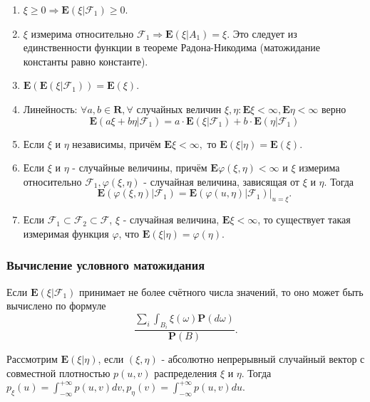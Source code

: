 \documentclass[oneside,final,14pt]{extreport}
\theoremstyle{definition}
\begin{document}
\begin{enumerate}
    \item $\xi \geq 0 \Rightarrow \mathbf{E}\left(\xi | \mathcal{F}_{1}\right) \geq 0.$
    \item $\xi$ измерима относительно $\mathcal{F}_1 \Rightarrow \mathbf{E}\left(\xi | A_{1}\right)=\xi$. Это следует из единственности функции в теореме Радона-Никодима (матожидание константы равно константе).
    \item $\mathbf{E}\left(\mathbf{E}\left(\xi | \mathcal{F}_{1}\right)\right)=\mathbf{E}(\xi)$.
    \item Линейность: $\forall a, b \in \mathbf{R}, \forall$ случайных величин $\xi, \eta: \mathbf{E} \xi<\infty, \mathbf{E} \eta<\infty$ верно
    $$\mathbf{E}\left(a \xi+b \eta | \mathcal{F}_{1}\right)=a \cdot \mathbf{E}\left(\xi | \mathcal{F}_{1}\right)+b \cdot \mathbf{E}\left(\eta | \mathcal{F}_{1}\right)$$
    \item Если $\xi$ и $\eta$ независимы, причём $\mathbf{E} \xi<\infty,$ то $\mathbf{E}(\xi | \eta)=\mathbf{E}(\xi)$.
    \item Если $\xi$ и $\eta$ - случайные величины, причём $\mathbf{E} \varphi(\xi, \eta)<\infty$ и $\xi$ измерима относительно $\mathcal{F}_1, \varphi(\xi,\eta)$ - случайная величина, зависящая от $\xi$ и $\eta$. Тогда
    $$\mathbf{E}\left(\varphi(\xi, \eta) | \mathcal{F}_{1}\right)=\left. \mathbf{E}\left(\varphi(u, \eta) | \mathcal{F}_{1}\right)\right|_{u=\xi}.$$
    \item Если $\mathcal{F}_1 \subset \mathcal{F}_2 \subset \mathcal{F}$, $\xi$ - случайная величина, $\mathbf{E} \xi<\infty$, то существует такая измеримая функция $\varphi$, что $\mathbf{E}(\xi|\eta) = \varphi(\eta)$.
\end{enumerate}

\subsubsection{Вычисление условного матожидания}

Если $\mathbf{E}(\xi|\mathcal{F}_1)$ принимает не более счётного числа значений, то оно может быть вычислено по формуле
$$\frac{\sum_{i} \int_{B_{i}} \xi(\omega) \mathbf{P}(d \omega)}{\mathbf{P}(B)}.$$

Рассмотрим $\mathbf{E}(\xi|\eta)$, если $(\xi,\eta)$ - абсолютно непрерывный случайный вектор с совместной плотностью $p(u,v)$ распределения $\xi$ и $\eta$. Тогда $p_{\xi}(u)=\int_{-\infty}^{+\infty} p(u, v) d v, p_{\eta}(v)=\int_{-\infty}^{+\infty} p(u, v) d u$.
\end{document}
